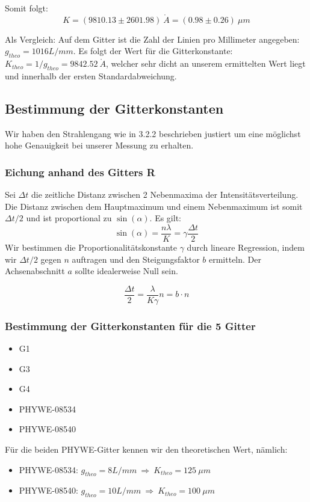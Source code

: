 Somit folgt: $$\boxed{K=(9810.13 \pm 2601.98) \ \mathring A = (0.98 \pm 0.26) \ \mu m}$$

Als Vergleich: Auf dem Gitter ist die Zahl der Linien pro Millimeter angegeben: \\ $g_{theo}=1016 L/mm$. Es folgt der Wert f\"ur die Gitterkonstante: $K_{theo} = 1/g_{theo} = 9842.52 \ \mathring A$, welcher sehr dicht an unserem ermittelten Wert liegt und innerhalb der ersten Standardabweichung.

\subsection{Bestimmung der Gitterkonstanten}

Wir haben den Strahlengang wie in 3.2.2 beschrieben justiert um eine m\"oglichst hohe Genauigkeit bei unserer Messung zu erhalten.

\subsubsection{Eichung anhand des Gitters R}

Sei $\Delta t$ die zeitliche Distanz zwischen 2 Nebenmaxima der Intensit\"atsverteilung. Die Distanz zwischen dem Hauptmaximum und einem Nebenmaximum ist somit $\Delta t/2$ und ist proportional zu $\sin(\alpha)$. Es gilt: $$\sin(\alpha) = \frac{n\lambda}{K} = \gamma \frac{\Delta t}{2}$$
Wir bestimmen die Proportionalit\"atskonstante $\gamma$ durch lineare Regression, indem wir $\Delta t/2$ gegen $n$ auftragen und den Steigungsfaktor $b$ ermitteln. Der Achsenabschnitt $a$ sollte idealerweise Null sein.

$$\frac{\Delta t}{2} = \frac{\lambda}{K\gamma}n = b\cdot n$$


\subsubsection{Bestimmung der Gitterkonstanten f\"ur die 5 Gitter}
\begin{itemize}
\item G1
\item G3
\item G4
\item PHYWE-08534
\item PHYWE-08540
\end{itemize}

F\"ur die beiden PHYWE-Gitter kennen wir den theoretischen Wert, n\"amlich: 
\begin{itemize}
\item PHYWE-08534: $g_{theo} = 8 L/mm\ \Rightarrow \ K_{theo} = 125 \ \mu m$
\item PHYWE-08540: $g_{theo} = 10 L/mm\ \Rightarrow \ K_{theo} = 100 \ \mu m$
\end{itemize} 

